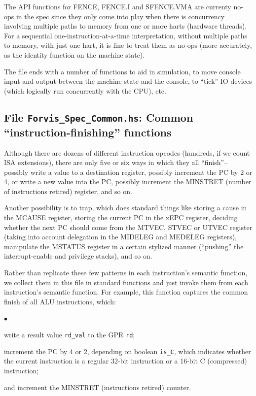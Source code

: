 \documentclass[11pt]{article}
\newenvironment{tightlist}%
{\begin{list}{$\bullet$}{%
    \setlength{\topsep}{0in}
    \setlength{\partopsep}{0in}
    \setlength{\itemsep}{0in}
    \setlength{\parsep}{0in}
    \setlength{\leftmargin}{1.5em}
    \setlength{\rightmargin}{0in}
    \setlength{\itemindent}{0in}
}
}%
{\end{list}
}
\begin{document}
The API functions for FENCE, FENCE.I and SFENCE.VMA are currenty
no-ops in the spec since they only come into play when there is
concurrency involving multiple paths to memory from one or more harts
(hardware threads).  For a sequential one-instruction-at-a-time
interpretation, without multiple paths to memory, with just one hart,
it is fine to treat them as no-ops (more accurately, as the identity
function on the machine state).

The file ends with a number of functions to aid in simulation, to move
console input and output between the machine state and the console, to
``tick'' IO devices (which logically run concurrently with the CPU), etc.


\subsection{File {\tt Forvis\_Spec\_Common.hs}: Common ``instruction-finishing'' functions}

\label{sec_standard_finish_functions}

Although there are dozens of different instruction opcodes (hundreds,
if we count ISA extensions), there are only five or six ways in which
they all ``finish''-- possibly write a value to a destination
register, possibly increment the PC by 2 or 4, or write a new value
into the PC, possibly increment the MINSTRET (number of instructions
retired) register, and so on.

Another possibility is to trap, which does standard things like
storing a cause in the MCAUSE register, storing the current PC in the
xEPC register, deciding whether the next PC should come from the
MTVEC, STVEC or UTVEC register (taking into account delegation in the
MIDELEG and MEDELEG registers), manipulate the MSTATUS register in a
certain stylized manner (``pushing'' the interrupt-enable and
privilege stacks), and so on.

Rather than replicate these few patterns in each instruction's
semantic function, we collect them in this file in standard functions
and just invoke them from each instruction's semantic function.  For
example, this function captures the common finish of all ALU
instructions, which:

\begin{tightlist}

\item write a result value \verb|rd_val| to the GPR \verb|rd|;

\item increment the PC by 4 or 2, depending on boolean \verb|is_C|,
which indicates whether the current instruction is a regular 32-bit
instruction or a 16-bit C (compressed) instruction;

\item and increment the MINSTRET (instructions retired) counter.

\end{tightlist}
\end{document}
